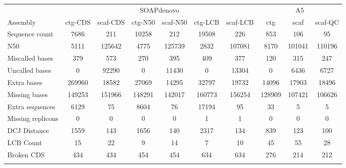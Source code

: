 \documentclass{bioinfo}
\begin{document}
\begin{table}[!t] 
{\begin{tabular}{l|cccccc|ccc}\toprule
&\multicolumn{6}{c|}{SOAPdenovo} & \multicolumn{3}{c}{A5} \\
Assembly           & ctg-CDS & scaf-CDS & ctg-N50 & scaf-N50 & ctg-LCB & scaf-LCB & ctg    & scaf     & scaf-QC   \\\midrule
Sequence count     & 7686    & 211      & 10258   & 212      & 19508   & 226      & 853    & 106      & 95      \\
N50                & 5111    & 125642   & 4775    & 125739   & 2832    & 107081   & 8170   & 101041   & 110196  \\
Miscalled bases    & 379     & 573      & 270     & 395      & 409     & 377      & 120    & 315      & 247     \\
Uncalled bases     & 0       & 92290    & 0       & 11430    & 0       & 13304    & 0      & 6436     & 6727    \\
Extra bases        & 269960  & 18582    & 27069   & 14295    & 32797   & 19732    & 14096  & 17903    & 18496   \\
Missing bases      & 149253  & 151966   & 148291  & 142017   & 160773  & 156254   & 128909 & 107421   & 106626  \\
Extra sequences    & 6129    & 75       & 8604    & 76       & 17194   & 95       & 33     & 5        & 5       \\
Missing replicons  & 0       & 0        & 0       & 0        & 1       & 1        & 0      & 0        & 0       \\
DCJ Distance       & 1559    & 143      & 1656    & 140      & 2317    & 134      & 839    & 123      & 100     \\
LCB Count          & 15      & 22       & 9       & 14       & 7       & 10       & 45     & 55       & 28      \\
Broken CDS         & 434     & 434      & 454     & 454      & 634     & 634      & 276    & 214      & 212     \\
\botrule \\
\end{tabular}}{}
\end{table}
\end{document}
